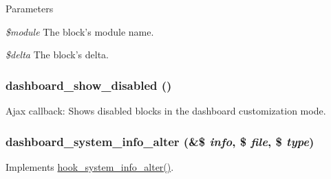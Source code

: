 \begin{DoxyParams}{Parameters}
\item[{\em \$module}]The block's module name. \item[{\em \$delta}]The block's delta. \end{DoxyParams}
\hypertarget{dashboard_8module_a4daa6ec664ef4e666918635c4fcb2002}{
\subsubsection[{dashboard\_\-show\_\-disabled}]{\setlength{\rightskip}{0pt plus 5cm}dashboard\_\-show\_\-disabled ()}}
\label{dashboard_8module_a4daa6ec664ef4e666918635c4fcb2002}
Ajax callback: Shows disabled blocks in the dashboard customization mode. \hypertarget{dashboard_8module_aaa46ea0b9298c11e6e2f4113dd1e6037}{
\subsubsection[{dashboard\_\-system\_\-info\_\-alter}]{\setlength{\rightskip}{0pt plus 5cm}dashboard\_\-system\_\-info\_\-alter (\&\$ {\em info}, \/  \$ {\em file}, \/  \$ {\em type})}}
\label{dashboard_8module_aaa46ea0b9298c11e6e2f4113dd1e6037}
Implements \hyperlink{group__hooks_ga7dd7f887131916d5bbbb02ae87a9113e}{hook\_\-system\_\-info\_\-alter()}.

